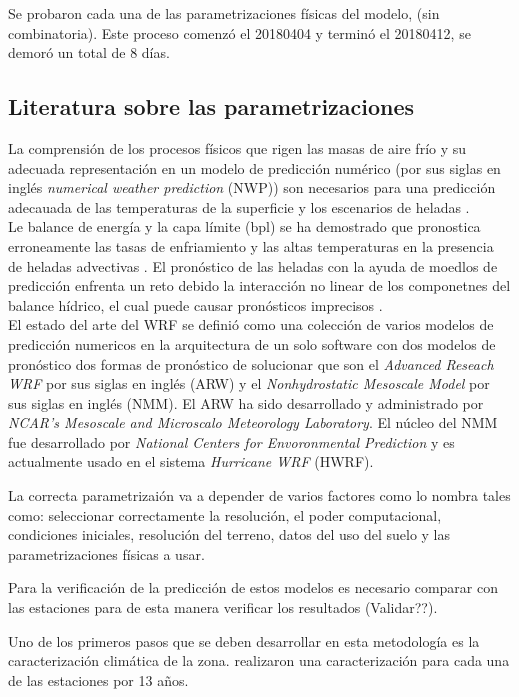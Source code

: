 \documentclass[11pt]{article}
\begin{document}
Se probaron cada una de las parametrizaciones físicas del modelo, (sin combinatoria). Este proceso comenzó el 20180404 y terminó el 20180412, se demoró un total de 8 días.
\subsection{Literatura sobre las parametrizaciones}

La comprensión de los procesos físicos que rigen las masas de aire frío y su adecuada representación en un modelo de predicción numérico (por sus siglas en inglés \textit{numerical weather prediction} (NWP)) son necesarios para una predicción adecauada de las temperaturas de la superficie y los escenarios de heladas \citep{prabha2008}.\\



Le balance de energía y la capa límite (bpl) se ha demostrado que pronostica erroneamente las tasas de enfriamiento y las altas temperaturas en la presencia de heladas advectivas \citep{heinemann1988}. El pronóstico de las heladas con la ayuda de moedlos de predicción enfrenta un reto debido la interacción no linear de los componetnes del balance hídrico, el cual puede causar pronósticos imprecisos \citep{gutowski2003}.\\

El estado del arte del WRF se definió como una colección de varios modelos de predicción numericos en la arquitectura de un solo software con dos modelos de pronóstico dos formas de pronóstico de solucionar que son el \textit{Advanced Reseach WRF} por sus siglas en inglés (ARW) y el \textit{Nonhydrostatic Mesoscale Model} por sus siglas en inglés (NMM). El ARW ha sido desarrollado y administrado por \textit{NCAR's Mesoscale and Microscalo Meteorology Laboratory}. El núcleo del NMM fue desarrollado por \textit{National Centers for Envoronmental Prediction} y es actualmente usado en el sistema \textit{Hurricane WRF} (HWRF).

La correcta parametrizaión va a depender de varios factores como lo nombra \citet{prabha2008evaluation} tales como: seleccionar correctamente la resolución, el poder computacional, condiciones iniciales, resolución del terreno, datos del uso del suelo y las parametrizaciones físicas a usar.

Para la verificación de la predicción de estos modelos es necesario comparar con las estaciones para de esta manera verificar los resultados (Validar??).

Uno de los primeros pasos que se deben desarrollar en esta metodología es la caracterización climática de la zona. \citet{prabha2008evaluation} realizaron una caracterización para cada una de las estaciones por 13 años.
\end{document}
